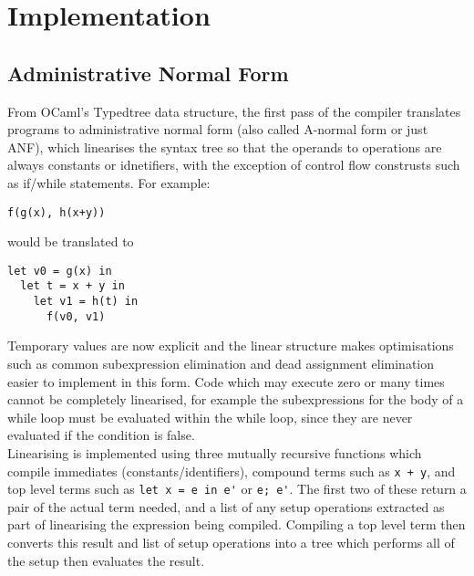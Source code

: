 \chapter{Implementation}

\section{Administrative Normal Form}
From OCaml's Typedtree data structure, the first pass of the compiler translates programs to administrative normal form (also called A-normal form or just ANF), which linearises the syntax tree so that the operands to operations are always constants or idnetifiers, with the exception of control flow construsts such as if/while statements. For example:

\begin{verbatim}
f(g(x), h(x+y))
\end{verbatim}
would be translated to
\begin{verbatim}
let v0 = g(x) in
  let t = x + y in 
    let v1 = h(t) in
      f(v0, v1)
\end{verbatim}

Temporary values are now explicit and the linear structure makes optimisations such as common subexpression elimination and dead assignment elimination easier to implement in this form. Code which may execute zero or many times cannot be completely linearised, for example the subexpressions for the body of a while loop must be evaluated within the while loop, since they are never evaluated if the condition is false. \\
Linearising is implemented using three mutually recursive functions which compile immediates (constants/identifiers), compound terms such as \verb|x + y|, and top level terms such as \verb|let x = e in e'| or \verb|e; e'|. The first two of these return a pair of the actual term needed, and a list of any setup operations extracted as part of linearising the expression being compiled. Compiling a top level term then converts this result and list of setup operations into a tree which performs all of the setup then evaluates the result.

